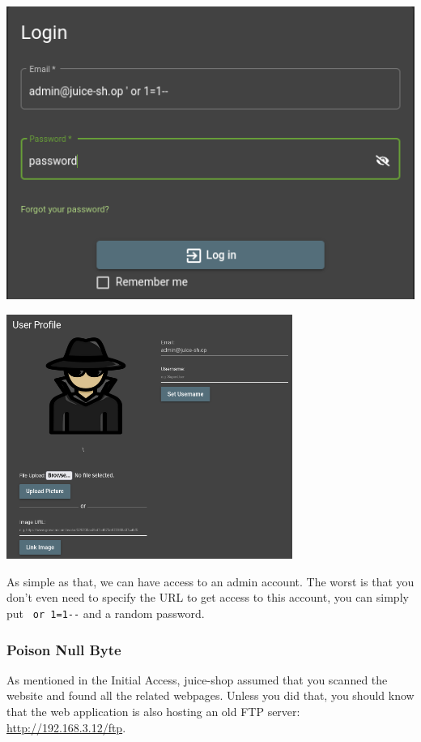 \documentclass[a4paper,11pt,singlespacing]{article}
\begin{document}
\includegraphics{Images/Image17.png}

\includegraphics[width=0.7\textwidth,height=0.7\textheight]{Images/Image18.png}

As simple as that, we can have access to an admin account. The worst is
that you don't even need to specify the URL to get access to this
account, you can simply put \texttt{\textquotesingle{}\ or\ 1=1-\/-} and
a random password.

\subsubsection{Poison Null Byte}\label{poison-null-byte}

As mentioned in the Initial Access, juice-shop assumed that you scanned
the website and found all the related webpages. Unless you did that, you
should know that the web application is also hosting an old FTP server:
\url{http://192.168.3.12/ftp}.
\end{document}
